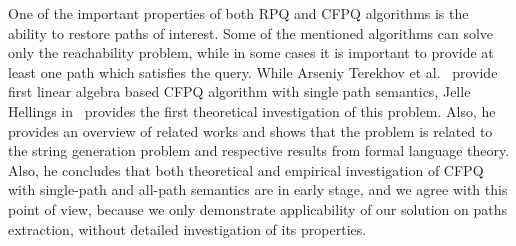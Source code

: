 One of the important properties of both RPQ and CFPQ algorithms is the ability to restore paths of interest. 
Some of the mentioned algorithms can solve only the reachability problem, while in some cases it is important to provide at least one path which satisfies the query. 
While Arseniy Terekhov et al.~\cite{10.1145/3398682.3399163} provide first linear algebra based CFPQ algorithm with single path semantics, Jelle Hellings in~\cite{HellSinglePath} provides the first theoretical investigation of this problem. Also, he provides an overview of related works and shows that the problem is related to the string generation problem and respective results from formal language theory.
Also, he concludes that both theoretical and empirical investigation of CFPQ with single-path and all-path semantics are in early stage, and we agree with this point of view, because we only demonstrate applicability of our solution on paths extraction, without detailed investigation of its properties.

